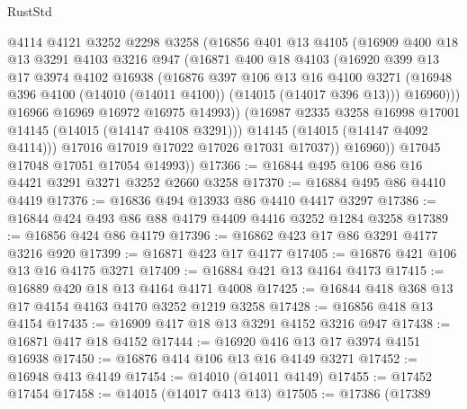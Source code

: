 \begin{lexlean}{RustStd}
\begin{coremodule}
                  @4114
                  @4121
                  @3252
                  @2298
                  @3258
                  (@16856
                    @401
                    @13
                    @4105
                    (@16909
                      @400
                      @18
                      @13
                      @3291
                      @4103
                      @3216
                      @947
                      (@16871
                        @400
                        @18
                        @4103
                        (@16920
                          @399
                          @13
                          @17
                          @3974
                          @4102
                          @16938
                          (@16876
                            @397
                            @106
                            @13
                            @16
                            @4100
                            @3271
                            (@16948 @396 @4100 (@14010 (@14011 @4100)) (@14015 (@14017 @396 @13)))
                            @16960)))
                      @16966
                      @16969
                      @16972
                      @16975
                      @14993))
                  (@16987 @2335 @3258 @16998 @17001 @14145 (@14015 (@14147 @4108 @3291)))
                  @14145
                  (@14015 (@14147 @4092 @4114)))
                @17016
                @17019
                @17022
                @17026
                @17031
                @17037))
            @16960))
        @17045
        @17048
        @17051
        @17054
        @14993))
@17366 := @16844 @495 @106 @86 @16 @4421 @3291 @3271 @3252 @2660 @3258
@17370 := @16884 @495 @86 @4410 @4419
@17376 := @16836 @494 @13933 @86 @4410 @4417 @3297
@17386 := @16844 @424 @493 @86 @88 @4179 @4409 @4416 @3252 @1284 @3258
@17389 := @16856 @424 @86 @4179
@17396 := @16862 @423 @17 @86 @3291 @4177 @3216 @920
@17399 := @16871 @423 @17 @4177
@17405 := @16876 @421 @106 @13 @16 @4175 @3271
@17409 := @16884 @421 @13 @4164 @4173
@17415 := @16889 @420 @18 @13 @4164 @4171 @4008
@17425 := @16844 @418 @368 @13 @17 @4154 @4163 @4170 @3252 @1219 @3258
@17428 := @16856 @418 @13 @4154
@17435 := @16909 @417 @18 @13 @3291 @4152 @3216 @947
@17438 := @16871 @417 @18 @4152
@17444 := @16920 @416 @13 @17 @3974 @4151 @16938
@17450 := @16876 @414 @106 @13 @16 @4149 @3271
@17452 := @16948 @413 @4149
@17454 := @14010 (@14011 @4149)
@17455 := @17452 @17454
@17458 := @14015 (@14017 @413 @13)
@17505 := @17386
    (@17389

\end{coremodule}
\end{lexlean}
